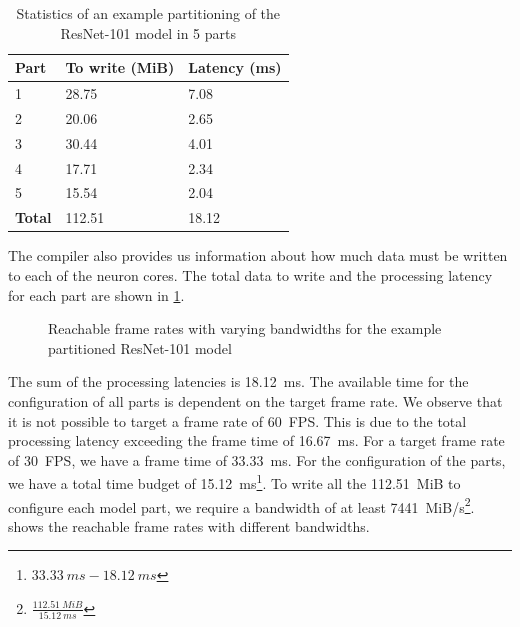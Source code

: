 \begin{table}[hbtp]
\centering
\begin{tabular}{@{}lll@{}}
\toprule
\textbf{Part}  & \textbf{To write (MiB)} & \textbf{Latency (ms)} \\ \midrule
1              & 28.75                   & 7.08                  \\
2              & 20.06                   & 2.65                  \\
3              & 30.44                   & 4.01                  \\
4              & 17.71                   & 2.34                  \\
5              & 15.54                   & 2.04                  \\ \midrule
\textbf{Total} & 112.51                  & 18.12                 \\ \bottomrule
\end{tabular}
\caption{Statistics of an example partitioning of the ResNet-101 model in 5 parts}
\label{tab:resnet101_5parts}
\end{table}

The compiler also provides us information about how much data must be written to each of the neuron cores.
The total data to write and the processing latency for each part are shown in \cref{tab:resnet101_5parts}.

\begin{figure}[hbtp]
    \centering
    
    \caption{Reachable frame rates with varying bandwidths for the example partitioned ResNet-101 model}
    \label{fig:large_model_bandwidth_analysis_example_resnet101}
\end{figure}

The sum of the processing latencies is \SI{18.12}{ms}.
The available time for the configuration of all parts is dependent on the target frame rate.
We observe that it is not possible to target a frame rate of \SI{60}{FPS}.
This is due to the total processing latency exceeding the frame time of \SI{16.67}{ms}. 
For a target frame rate of \SI{30}{FPS}, we have a frame time of \SI{33.33}{ms}.
For the configuration of the parts, we have a total time budget of \SI{15.12}{ms}\footnote{$\SI{33.33}{ms} - \SI{18.12}{ms}$}.
To write all the \SI{112.51}{MiB} to configure each model part, we require a bandwidth of at least \SI{7441}{MiB/s}\footnote{$\frac{\SI{112.51}{MiB}}{\SI{15.12}{ms}}$}.
 shows the reachable frame rates with different bandwidths.

